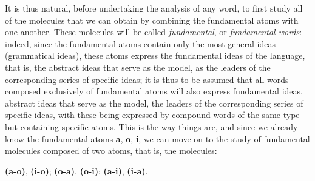 \begin{sloppypar}
{    It is thus natural, before undertaking the analysis of any word,
    to first study all of the molecules that we can obtain by
    combining the fundamental atoms with one another. These molecules
    will be called \emph{fundamental}, or \emph{fundamental words}:
    indeed, since the fundamental atoms contain only the most general
    ideas (grammatical ideas), these atoms express the fundamental
    ideas of the language, that is, the abstract ideas that serve as
    the model, as the leaders of the corresponding series of specific
    ideas; it is thus to be assumed that all words composed
    exclusively of fundamental atoms will also express fundamental
    ideas, abstract ideas that serve as the model, the leaders of the
    corresponding series of specific ideas, with these being expressed
    by compound words of the same type but containing specific
    atoms. This is the way things are, and since we already know the
    fundamental atoms \textbf{a}, \textbf{o}, \textbf{i}, we can move
    on to the study of fundamental molecules composed of two atoms,
    that is, the molecules:

    \begin{center}
      \textbf{(a-o)}, \textbf{(i-o)}; \textbf{(o-a)},
      \textbf{(o-i)};\textbf{ (a-i)}, \textbf{(i-a)}.
    \end{center}
  }

\end{sloppypar}

